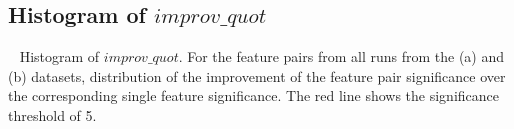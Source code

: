 \subsection{Histogram of $improv\_quot$}~\label{appF_exp_hist}
Histogram of $improv\_quot$. For the \toptwenty feature pairs from all runs from the (a) \msig and (b) \lincs datasets, distribution of the improvement of the feature pair significance over the corresponding single feature significance. The red line shows the significance threshold of 5.
\begin{figure}[!htb]
\centering %
\vspace{-5mm}
\label{fig:histogram_diff}
\end{figure}
